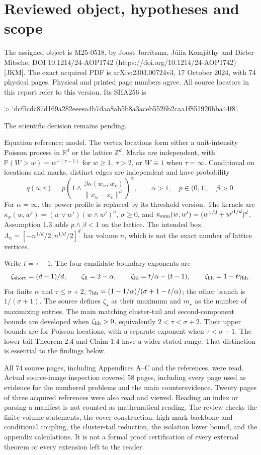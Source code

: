 \documentclass[10pt]{article}
\begin{document}
\section*{Reviewed object, hypotheses and scope}
The assigned object is M25-0518, by Joost Jorritsma, Júlia Komjáthy and Dieter Mitsche, DOI 10.1214/24-AOP1742 (https://doi.org/10.1214/24-AOP1742) [JKM]. The exact acquired PDF is arXiv:2303.00724v3, 17 October 2024, with 74 physical pages. Physical and printed page numbers agree. All source locators in this report refer to this version. Its SHA256 is\par
> `dcf5cdc87d169a282eeeea4b7daa8ab5b8a3aceb5526b2caa1f851920bba44f8`.\par
The scientific decision remains pending.\par
Equation reference: model. The vertex locations form either a unit-intensity Poisson process in \(\mathbb R^d\) or the lattice \(\mathbb Z^d\). Marks are independent, with \(\mathbb P(W>w)=w^{-(\tau-1)}\) for \(w\geq1,\ \tau>2\), or \(W\equiv1\) when \(\tau=\infty\). Conditional on locations and marks, distinct edges are independent and have probability \[
 q(u,v)=p\left(1\wedge
 \frac{\beta\kappa(w_u,w_v)}{\|x_u-x_v\|^d}\right)^\alpha,
 \qquad \alpha>1,\quad p\in(0,1],\quad\beta>0.\] For \(\alpha=\infty\), the power profile is replaced by its threshold version. The kernels are \(\kappa_\sigma(w,w')=(w\vee w')(w\wedge w')^\sigma\), \(\sigma\geq0\), and \(\kappa_{\rm sum}(w,w')=(w^{1/d}+{w'}^{1/d})^d\). Assumption 1.3 adds \(p\wedge\beta<1\) on the lattice. The intended box \(\Lambda_n=[-n^{1/d}/2,n^{1/d}/2]^d\) has volume \(n\), which is not the exact number of lattice vertices.\par
Write \(t=\tau-1\). The four candidate boundary exponents are \[\zeta_{\rm short}=(d-1)/d,\qquad
 \zeta_{\rm ll}=2-\alpha,\qquad
 \zeta_{\rm hl}=t/\alpha-(t-1),\qquad
 \zeta_{\rm hh}=1-t\gamma_{\rm hh}.\] For finite \(\alpha\) and \(\tau\leq\sigma+2\), \(\gamma_{\rm hh}=(1-1/\alpha)/(\sigma+1-t/\alpha)\); the other branch is \(1/(\sigma+1)\). The source defines \(\zeta_\star\) as their maximum and \(m_\star\) as the number of maximizing entries. The main matching cluster-tail and second-component bounds are developed when \(\zeta_{\rm hh}>0\), equivalently \(2<\tau<\sigma+2\). Their upper bounds are for Poisson locations, with a separate exponent when \(\tau<\sigma+1\). The lower-tail Theorem 2.4 and Claim 1.4 have a wider stated range. That distinction is essential to the findings below.\par
All 74 source pages, including Appendices A–C and the references, were read. Actual source-image inspection covered 58 pages, including every page used as evidence for the numbered problems and the main counterevidence. Twenty pages of three acquired references were also read and viewed. Reading an index or parsing a manifest is not counted as mathematical reading. The review checks the finite-volume statements, the cover construction, high-mark backbone and conditional coupling, the cluster-tail reduction, the isolation lower bound, and the appendix calculations. It is not a formal proof certification of every external theorem or every extension left to the reader.\par
\end{document}
